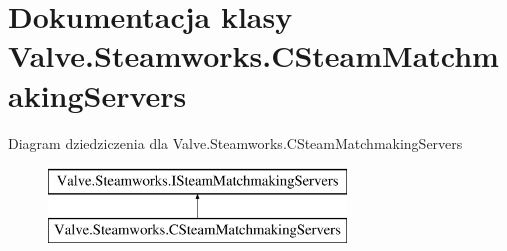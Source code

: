 \hypertarget{class_valve_1_1_steamworks_1_1_c_steam_matchmaking_servers}{}\section{Dokumentacja klasy Valve.\+Steamworks.\+C\+Steam\+Matchmaking\+Servers}
\label{class_valve_1_1_steamworks_1_1_c_steam_matchmaking_servers}
Diagram dziedziczenia dla Valve.\+Steamworks.\+C\+Steam\+Matchmaking\+Servers\begin{figure}[H]
\begin{center}
\leavevmode
\includegraphics[height=2.000000cm]{class_valve_1_1_steamworks_1_1_c_steam_matchmaking_servers}
\end{center}
\end{figure}
